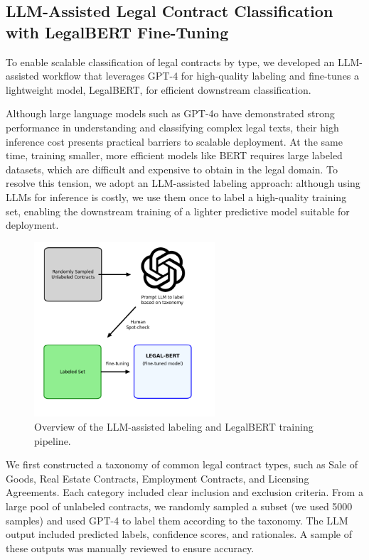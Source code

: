 \documentclass[11pt, oneside]{article}   	%
\begin{document}
\subsection*{LLM-Assisted Legal Contract Classification with LegalBERT Fine-Tuning}

To enable scalable classification of legal contracts by type, we developed an LLM-assisted workflow that leverages GPT-4 for high-quality labeling and fine-tunes a lightweight model, LegalBERT, for efficient downstream classification.

Although large language models such as GPT-4o have demonstrated strong performance in understanding and classifying complex legal texts, their high inference cost presents practical barriers to scalable deployment. At the same time, training smaller, more efficient models like BERT requires large labeled datasets, which are difficult and expensive to obtain in the legal domain. To resolve this tension, we adopt an LLM-assisted labeling approach: although using LLMs for inference is costly, we use them once to label a high-quality training set, enabling the downstream training of a lighter predictive model suitable for deployment.

\begin{figure}[htbp]
    \centering
    \includegraphics[width=0.6\textwidth]{llmtag.png} 
    \caption{Overview of the LLM-assisted labeling and LegalBERT training pipeline.}
    \label{fig:llm_flowchart}
\end{figure}

We first constructed a taxonomy of common legal contract types, such as Sale of Goods, Real Estate Contracts, Employment Contracts, and Licensing Agreements. Each category included clear inclusion and exclusion criteria. From a large pool of unlabeled contracts, we randomly sampled a subset (we used 5000 samples) and used GPT-4 to label them according to the taxonomy. The LLM output included predicted labels, confidence scores, and rationales. A sample of these outputs was manually reviewed to ensure accuracy.
\end{document}

